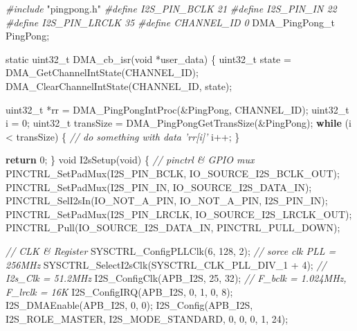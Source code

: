 \documentclass[
  12pt,
]{book}
\newenvironment{Shaded}{\begin{snugshade}}{\end{snugshade}}
\newcommand{\CommentTok}[1]{\textcolor[rgb]{0.56,0.35,0.01}{\textit{#1}}}
\newcommand{\ControlFlowTok}[1]{\textcolor[rgb]{0.13,0.29,0.53}{\textbf{#1}}}
\newcommand{\DataTypeTok}[1]{\textcolor[rgb]{0.13,0.29,0.53}{#1}}
\newcommand{\DecValTok}[1]{\textcolor[rgb]{0.00,0.00,0.81}{#1}}
\newcommand{\ImportTok}[1]{#1}
\newcommand{\NormalTok}[1]{#1}
\newcommand{\PreprocessorTok}[1]{\textcolor[rgb]{0.56,0.35,0.01}{\textit{#1}}}
\begin{document}
\begin{Shaded}
\begin{Highlighting}[]
\PreprocessorTok{#include }\ImportTok{"pingpong.h"}
\PreprocessorTok{#define I2S_PIN_BCLK        21}
\PreprocessorTok{#define I2S_PIN_IN          22}
\PreprocessorTok{#define I2S_PIN_LRCLK       35}
\PreprocessorTok{#define CHANNEL_ID  0}
\NormalTok{DMA_PingPong_t PingPong;}

\DataTypeTok{static} \DataTypeTok{uint32_t}\NormalTok{ DMA_cb_isr(}\DataTypeTok{void}\NormalTok{ *user_data)}
\NormalTok{\{}
    \DataTypeTok{uint32_t}\NormalTok{ state = DMA_GetChannelIntState(CHANNEL_ID);}
\NormalTok{    DMA_ClearChannelIntState(CHANNEL_ID, state);}

    \DataTypeTok{uint32_t}\NormalTok{ *rr = DMA_PingPongIntProc(&PingPong, CHANNEL_ID);}
    \DataTypeTok{uint32_t}\NormalTok{ i = }\DecValTok{0}\NormalTok{;}
    \DataTypeTok{uint32_t}\NormalTok{ transSize = DMA_PingPongGetTransSize(&PingPong);}
    \ControlFlowTok{while}\NormalTok{ (i < transSize) \{}
        \CommentTok{// do something with data 'rr[i]'}
\NormalTok{        i++;}
\NormalTok{    \}}

    \ControlFlowTok{return} \DecValTok{0}\NormalTok{;}
\NormalTok{\}}
\DataTypeTok{void}\NormalTok{ I2sSetup(}\DataTypeTok{void}\NormalTok{)}
\NormalTok{\{}
    \CommentTok{// pinctrl & GPIO mux}
\NormalTok{    PINCTRL_SetPadMux(I2S_PIN_BCLK, IO_SOURCE_I2S_BCLK_OUT);}
\NormalTok{    PINCTRL_SetPadMux(I2S_PIN_IN, IO_SOURCE_I2S_DATA_IN);}
\NormalTok{    PINCTRL_SelI2sIn(IO_NOT_A_PIN, IO_NOT_A_PIN, I2S_PIN_IN);}
\NormalTok{    PINCTRL_SetPadMux(I2S_PIN_LRCLK, IO_SOURCE_I2S_LRCLK_OUT);}
\NormalTok{    PINCTRL_Pull(IO_SOURCE_I2S_DATA_IN, PINCTRL_PULL_DOWN);}
    
    \CommentTok{// CLK & Register}
\NormalTok{    SYSCTRL_ConfigPLLClk(}\DecValTok{6}\NormalTok{, }\DecValTok{128}\NormalTok{, }\DecValTok{2}\NormalTok{); }\CommentTok{// sorce clk PLL = 256MHz}
\NormalTok{    SYSCTRL_SelectI2sClk(SYSCTRL_CLK_PLL_DIV_1 + }\DecValTok{4}\NormalTok{); }\CommentTok{// I2s_Clk = 51.2MHz}
\NormalTok{    I2S_ConfigClk(APB_I2S, }\DecValTok{25}\NormalTok{, }\DecValTok{32}\NormalTok{); }\CommentTok{// F_bclk = 1.024MHz, F_lrclk = 16K}
\NormalTok{    I2S_ConfigIRQ(APB_I2S, }\DecValTok{0}\NormalTok{, }\DecValTok{1}\NormalTok{, }\DecValTok{0}\NormalTok{, }\DecValTok{8}\NormalTok{);}
\NormalTok{    I2S_DMAEnable(APB_I2S, }\DecValTok{0}\NormalTok{, }\DecValTok{0}\NormalTok{);    }
\NormalTok{    I2S_Config(APB_I2S, I2S_ROLE_MASTER, I2S_MODE_STANDARD, }\DecValTok{0}\NormalTok{, }\DecValTok{0}\NormalTok{, }\DecValTok{0}\NormalTok{, }\DecValTok{1}\NormalTok{, }\DecValTok{24}\NormalTok{);}


\end{Highlighting}
\end{Shaded}
\end{document}
